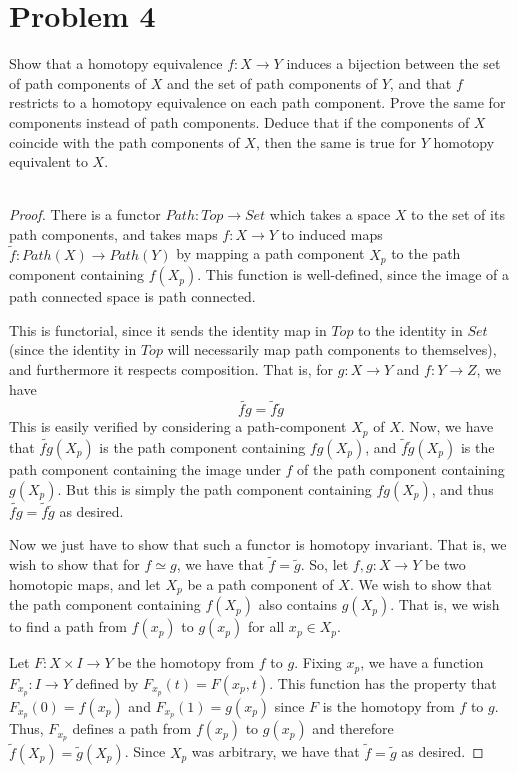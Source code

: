 \documentclass[fontsize=11pt]{scrartcl} %
\numberwithin{equation}{section} %
\numberwithin{figure}{section} %
\numberwithin{table}{section} %
\begin{document}
\newpage

\section*{Problem 4}
Show that a homotopy equivalence $f:X\to Y$ induces a bijection between the set
of path components of $X$ and the set of path components of $Y$, and that $f$
restricts to a homotopy equivalence on each path component. Prove the same for
components instead of path components. Deduce that if the components of $X$
coincide with the path components of $X$, then the same is true for $Y$ homotopy
equivalent to $X$.
\\
\\
\begin{proof}
    There is a functor $Path:Top\to Set$ which takes a space $X$ to the set of
    its path components, and takes maps $f:X\to Y$ to induced maps
    $\tilde{f}:Path(X)\to Path(Y)$ by mapping a path component $X_p$ to the path
    component containing $f(X_p)$. This function is well-defined, since the
    image of a path connected space is path connected.

    This is functorial, since it sends the identity map in $Top$ to the identity
    in $Set$ (since the identity in $Top$ will necessarily map path components
    to themselves), and furthermore it respects composition. That is, for
    $g:X\to Y$ and $f:Y\to Z$, we have
    \[
        \widetilde{fg} = \tilde{f}\tilde{g}
    \]
    This is easily verified by considering a path-component $X_p$ of $X$. Now,
    we have that $\widetilde{fg}(X_p)$ is the path component containing
    $fg(X_p)$, and $\tilde{f}\tilde{g}(X_p)$ is the path component containing
    the image under $f$ of the path component containing $g(X_p)$. But this is
    simply the path component containing $fg(X_p)$, and thus
    $\widetilde{fg}=\tilde{f}\tilde{g}$ as desired.

    Now we just have to show that such a functor is homotopy invariant. That is,
    we wish to show that for $f\simeq g$, we have that $\tilde{f}=\tilde{g}$.
    So, let $f,g:X\to Y$ be two homotopic maps, and let $X_p$ be a path
    component of $X$. We wish to show that the path component containing
    $f(X_p)$ also contains $g(X_p)$. That is, we wish to find a path from
    $f(x_p)$ to $g(x_p)$ for all $x_p\in X_p$. 
    
    Let $F:X\times I\to Y$ be the
    homotopy from $f$ to $g$. Fixing $x_p$, we have a function $F_{x_p}:I\to Y$
    defined by $F_{x_p}(t) = F(x_p,t)$. This function has the property that
    $F_{x_p}(0)=f(x_p)$ and $F_{x_p}(1)=g(x_p)$ since $F$ is the homotopy from
    $f$ to $g$. Thus, $F_{x_p}$ defines a path from $f(x_p)$ to $g(x_p)$ and
    therefore $\tilde{f}(X_p)=\tilde{g}(X_p)$. Since $X_p$ was arbitrary, we
    have that $\tilde{f}=\tilde{g}$ as desired.


\end{proof}
\end{document}
